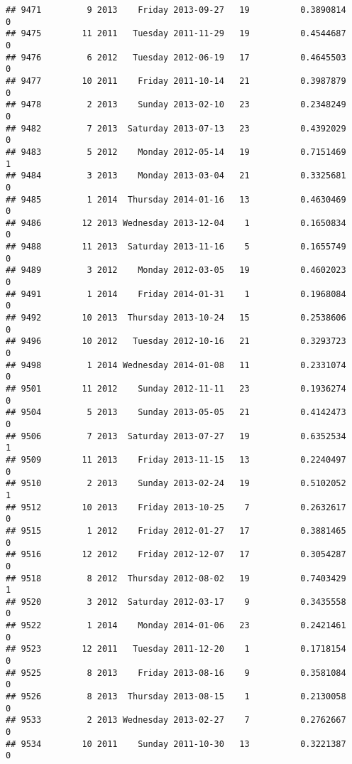 \documentclass[
]{article}
\begin{document}
\begin{verbatim}
## 9471         9 2013    Friday 2013-09-27   19          0.3890814             0
## 9475        11 2011   Tuesday 2011-11-29   19          0.4544687             0
## 9476         6 2012   Tuesday 2012-06-19   17          0.4645503             0
## 9477        10 2011    Friday 2011-10-14   21          0.3987879             0
## 9478         2 2013    Sunday 2013-02-10   23          0.2348249             0
## 9482         7 2013  Saturday 2013-07-13   23          0.4392029             0
## 9483         5 2012    Monday 2012-05-14   19          0.7151469             1
## 9484         3 2013    Monday 2013-03-04   21          0.3325681             0
## 9485         1 2014  Thursday 2014-01-16   13          0.4630469             0
## 9486        12 2013 Wednesday 2013-12-04    1          0.1650834             0
## 9488        11 2013  Saturday 2013-11-16    5          0.1655749             0
## 9489         3 2012    Monday 2012-03-05   19          0.4602023             0
## 9491         1 2014    Friday 2014-01-31    1          0.1968084             0
## 9492        10 2013  Thursday 2013-10-24   15          0.2538606             0
## 9496        10 2012   Tuesday 2012-10-16   21          0.3293723             0
## 9498         1 2014 Wednesday 2014-01-08   11          0.2331074             0
## 9501        11 2012    Sunday 2012-11-11   23          0.1936274             0
## 9504         5 2013    Sunday 2013-05-05   21          0.4142473             0
## 9506         7 2013  Saturday 2013-07-27   19          0.6352534             1
## 9509        11 2013    Friday 2013-11-15   13          0.2240497             0
## 9510         2 2013    Sunday 2013-02-24   19          0.5102052             1
## 9512        10 2013    Friday 2013-10-25    7          0.2632617             0
## 9515         1 2012    Friday 2012-01-27   17          0.3881465             0
## 9516        12 2012    Friday 2012-12-07   17          0.3054287             0
## 9518         8 2012  Thursday 2012-08-02   19          0.7403429             1
## 9520         3 2012  Saturday 2012-03-17    9          0.3435558             0
## 9522         1 2014    Monday 2014-01-06   23          0.2421461             0
## 9523        12 2011   Tuesday 2011-12-20    1          0.1718154             0
## 9525         8 2013    Friday 2013-08-16    9          0.3581084             0
## 9526         8 2013  Thursday 2013-08-15    1          0.2130058             0
## 9533         2 2013 Wednesday 2013-02-27    7          0.2762667             0
## 9534        10 2011    Sunday 2011-10-30   13          0.3221387             0

\end{verbatim}
\end{document}

